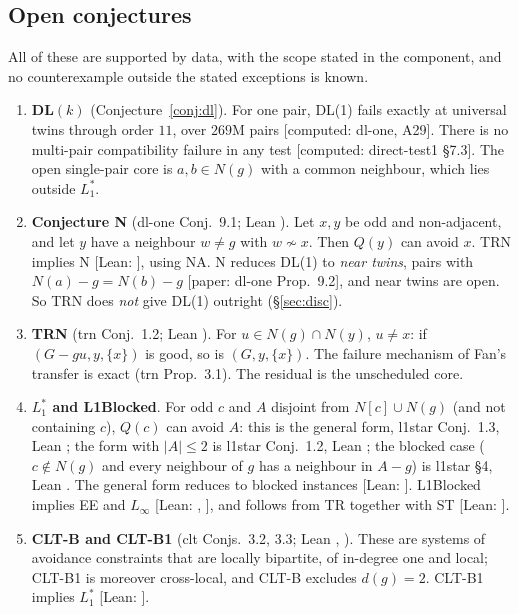 \documentclass[11pt]{amsart}
\theoremstyle{definition}
\newcommand{\st}[1]{\textsf{\small[#1]}}
\begin{document}
\subsection{Open conjectures}\label{sec:open}
All of these are supported by data, with the scope stated in the component, and no counterexample
outside the stated exceptions is known.
\begin{enumerate}[leftmargin=*]
\item \textbf{DL$(k)$} (Conjecture~\ref{conj:dl}). For one pair, DL(1) fails exactly at universal twins
through order $11$, over $269$M pairs \st{computed: dl-one, A29}. There is no multi-pair compatibility
failure in any test \st{computed: direct-test1 \S7.3}. The open single-pair core is $a,b\in N(g)$ with a
common neighbour, which lies outside $L_1^*$.
\item \textbf{Conjecture N} (dl-one Conj.~9.1; Lean ). Let $x,y$ be odd and non-adjacent,
and let $y$ have a neighbour $w\ne g$ with $w\not\sim x$. Then $Q(y)$ can avoid $x$. TRN implies N
\st{Lean: }, using NA. N reduces DL(1) to \emph{near twins}, pairs with
$N(a)-g=N(b)-g$ \st{paper: dl-one Prop.~9.2}, and near twins are open. So TRN does \emph{not} give
DL(1) outright (\S\ref{sec:disc}).
\item \textbf{TRN} (trn Conj.~1.2; Lean ). For $u\in N(g)\cap N(y)$, $u\ne x$:
if $(G-gu,y,\{x\})$ is good, so is $(G,y,\{x\})$. The failure mechanism of Fan's transfer is exact (trn
Prop.~3.1). The residual is the unscheduled core.
\item \textbf{$L_1^*$ and L1Blocked}. For odd $c$ and $A$ disjoint from $N[c]\cup N(g)$ (and not
containing $c$), $Q(c)$ can avoid $A$: this is the general form, l1star Conj.~1.3, Lean
; the form with $|A|\le2$ is l1star Conj.~1.2, Lean ; the blocked case
($c\notin N(g)$ and every neighbour of $g$ has a neighbour in $A-g$) is l1star \S4, Lean
. The general form reduces to blocked
instances \st{Lean: }. L1Blocked implies EE and $L_\infty$ \st{Lean:
, }, and follows from TR together with ST \st{Lean:
}.
\item \textbf{CLT-B and CLT-B1} (clt Conjs.~3.2, 3.3; Lean , ). These are systems
of avoidance constraints that are locally bipartite, of in-degree one and local; CLT-B1 is moreover
cross-local, and CLT-B excludes $d(g)=2$. CLT-B1 implies $L_1^*$ \st{Lean: }.

\end{enumerate}
\end{document}
